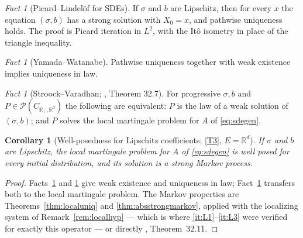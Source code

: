 \documentclass[11pt,a4paper]{article}
\theoremstyle{plain}
\newtheorem{corollary}[theorem]{Corollary}
\theoremstyle{definition}
\theoremstyle{remark}
\newtheorem{fact}[theorem]{Fact}
\newcommand{\R}{\mathbb{R}}
\newcommand{\Rp}{\R_+}
\newcommand{\Prob}{\mathcal{P}}                %
\newcommand{\KA}{\cite{Kal21}}
\begin{document}
\begin{fact}[Picard--Lindel\"of for SDEs]
  \label{fact:picard}
  If $\sigma$ and $b$ are Lipschitz, then for every $x$ the equation
  $(\sigma,b)$ has a strong solution with $X_0 = x$, and pathwise uniqueness
  holds.  The proof is Picard iteration in $L^2$, with the It\^o isometry in place
  of the triangle inequality.
\end{fact}

\begin{fact}[Yamada--Watanabe]
  \label{fact:yamadawatanabe}
  Pathwise uniqueness together with weak existence implies uniqueness in law.
\end{fact}

\begin{fact}[Stroock--Varadhan; \KA, Theorem 32.7]
  \label{fact:strookvaradhan}
  For progressive $\sigma, b$ and $P \in \Prob(C_{\Rp,\R^d})$ the following are
  equivalent: $P$ is the law of a weak solution of $(\sigma,b)$; and $P$ solves
  the local martingale problem for $A$ of \eqref{eq:sdegen}.
\end{fact}

\begin{corollary}[Well-posedness for Lipschitz coefficients; \eqref{T3}, $E = \R^d$]
  \label{cor:sdewellposed}
  If $\sigma$ and $b$ are Lipschitz, the local martingale problem for $A$ of
  \eqref{eq:sdegen} is well posed for every initial distribution, and its solution
  is a strong Markov process.
\end{corollary}

\begin{proof}
  Facts~\ref{fact:picard} and \ref{fact:yamadawatanabe} give weak existence and
  uniqueness in law; Fact~\ref{fact:strookvaradhan} transfers both to the local
  martingale problem.  The Markov properties are
  Theorems~\ref{thm:localuniq} and \ref{thm:absstrongmarkov}, applied with the
  localizing system of Remark~\ref{rem:localhyp} --- which is where
  \ref{it:L1}--\ref{it:L3} were verified for exactly this operator --- or
  directly \KA, Theorem~32.11.
\end{proof}
\end{document}
